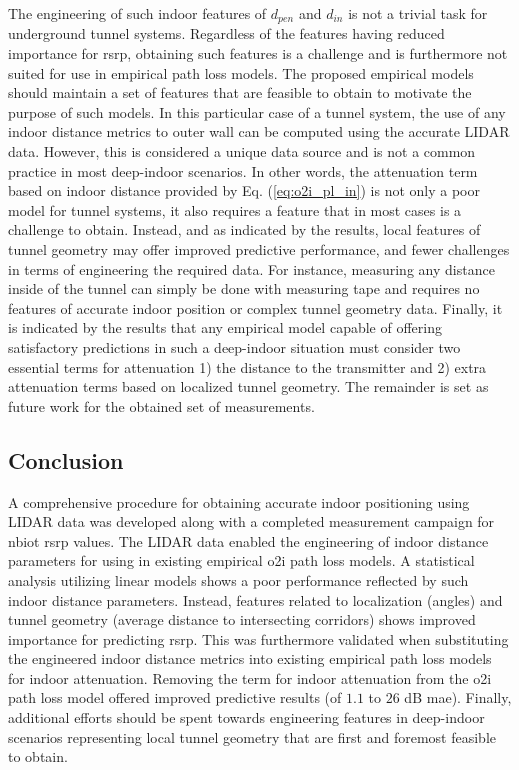 The engineering of such indoor features of $d_{pen}$ and $d_{in}$ is not a trivial task for underground tunnel systems. Regardless of the features having reduced importance for \gls{rsrp}, obtaining such features is a challenge and is furthermore not suited for use in empirical path loss models. The proposed empirical models should maintain a set of features that are feasible to obtain to motivate the purpose of such models. In this particular case of a tunnel system, the use of any indoor distance metrics to outer wall can be computed using the accurate LIDAR data. However, this is considered a unique data source and is not a common practice in most deep-indoor scenarios. In other words, the attenuation term based on indoor distance provided by Eq. (\ref{eq:o2i_pl_in}) is not only a poor model for tunnel systems, it also requires a feature that in most cases is a challenge to obtain. Instead, and as indicated by the results, local features of tunnel geometry may offer improved predictive performance, and fewer challenges in terms of engineering the required data. For instance, measuring any distance inside of the tunnel can simply be done with measuring tape and requires no features of accurate indoor position or complex tunnel geometry data. Finally, it is indicated by the results that any empirical model capable of offering satisfactory predictions in such a deep-indoor situation must consider two essential terms for attenuation 1) the distance to the transmitter and 2) extra attenuation terms based on localized tunnel geometry. The remainder is set as future work for the obtained set of measurements.

\subsection{Conclusion }

A comprehensive procedure for obtaining accurate indoor positioning using LIDAR data was developed along with a completed measurement campaign for \gls{nbiot} \gls{rsrp} values. The LIDAR data enabled the engineering of indoor distance parameters for using in existing empirical \gls{o2i} path loss models. A statistical analysis utilizing linear models shows a poor performance reflected by such indoor distance parameters. Instead, features related to localization (angles) and tunnel geometry (average distance to intersecting corridors) shows improved importance for predicting \gls{rsrp}. This was furthermore validated when substituting the engineered indoor distance metrics into existing empirical path loss models for indoor attenuation. Removing the term for indoor attenuation from the \gls{o2i} path loss model offered improved predictive results (of $1.1$ to $26$ dB \gls{mae}). Finally, additional efforts should be spent towards engineering features in deep-indoor scenarios representing local tunnel geometry that are first and foremost feasible to obtain. 

